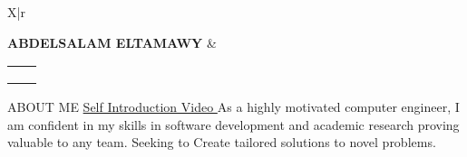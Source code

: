 \documentclass{resume}
\makeatletter
\newcommand{\email}{abdelsalam@solom.dev}
\makeatother
\begin{document}
\begin{tabularx}{\textwidth}{X|r}
	
	{\LARGE\MakeUppercase{\bf Abdelsalam ElTamawy}}
	&
	\small{
		\begin{tabular}{ll}
			\href{mailto:\email}{\iconanot{\faEnvelope}{\email}} & \href{https://solom.dev}{\iconanot{\faGlobe}{solom.dev}} \\
			\href{https://github.com/solomspd}{\iconanot{\faGithub}{github.com/solomspd}} & \href{tel:+201003435365}{\iconanot{\faPhone}{(+20)1003435365}} \\
			\href{https://linkedin.com/in/abdelsalam-et}{\iconanot{\faLinkedin}{/in/abdelsalam-et}} & \iconanot{\faMapMarker}{Cairo, Egypt} \\
		\end{tabular}
	}

\end{tabularx}

\begin{rsection}{\MakeUppercase{about me} \hfill \href{https://www.youtube.com/watch?v=8wwv_bj3Hvc}{Self Introduction Video \iconin{\faYoutubePlay}}}{}{}
	As a highly motivated computer engineer, I am confident in my skills in software development and academic research proving valuable to any team.
	Seeking to Create tailored solutions to novel problems.
\end{rsection}
\end{document}
